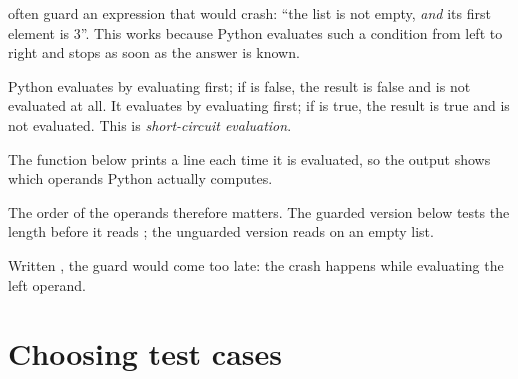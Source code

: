  often guard an expression that would crash: ``the list is not empty, \emph{and} its first element is
3''. This works because Python evaluates such a condition from left to right and stops as soon as the answer is
known.

\begin{definition}\label{def:g10:specifications-and-tests:short-circuit}
Python evaluates  by evaluating  first; if  is false, the result is false and
 is not evaluated at all. It evaluates  by evaluating  first; if  is true,
the result is true and  is not evaluated. This is \emph{short-circuit evaluation}.
\end{definition}

The function  below prints a line each time it is evaluated, so the output shows which operands Python
actually computes.

\label{lst:g10:specifications-and-tests:short-circuit}

\label{out:g10:specifications-and-tests:short-circuit}

The order of the operands therefore matters. The guarded version below tests the length before it reads
; the unguarded version reads  on an empty list.

\label{lst:g10:specifications-and-tests:guard}

\label{out:g10:specifications-and-tests:guard}

Written , the guard would come too late: the crash happens while evaluating the
left operand.

\section{Choosing test cases}\label{sec:g10:specifications-and-tests:choosing}

